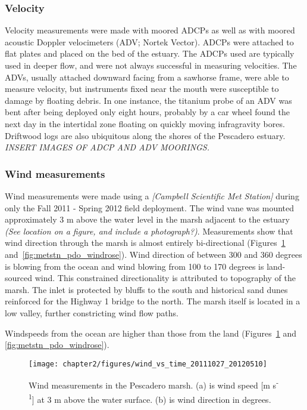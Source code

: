 \subsubsection{Velocity} \label{sssec:velmeas}
Velocity measurements were made with moored ADCPs as well as with moored acoustic Doppler velocimeters (ADV; Nortek Vector). ADCPs were attached to flat plates and placed on the bed of the estuary. The ADCPs used are typically used in deeper flow, and were not always successful in measuring velocities. The ADVs, usually attached downward facing from a sawhorse frame, were able to measure velocity, but instruments fixed near the mouth were susceptible to damage by floating debris. In one instance, the titanium probe of an ADV was bent after being deployed only eight hours, probably by a car wheel found the next day in the intertidal zone floating on quickly moving infragravity bores. Driftwood logs are also ubiquitous along the shores of the Pescadero estuary.  \emph{INSERT IMAGES OF ADCP AND ADV MOORINGS.}


\subsubsection{Wind measurements} \label{sssec:windmeas}
Wind measurements were made using a \emph{[Campbell Scientific Met Station]} during only the Fall 2011 - Spring 2012 field deployment. The wind vane was mounted approximately 3 m above the water level in the marsh adjacent to the estuary \emph{(See location on a figure, and include a photograph?)}.  Measurements show that wind direction through the marsh is almost entirely bi-directional (Figures~\ref{fig:metstn_pdo_ws_wdir} and~\ref{fig:metstn_pdo_windrose}). Wind direction of between 300 and 360 degrees is blowing from the ocean and wind blowing from 100 to 170 degrees is land-sourced wind. This constrained directionality is attributed to topography of the marsh.  The inlet is protected by bluffs to the south and historical sand dunes reinforced for the Highway 1 bridge to the north. The marsh itself is located in a low valley, further constricting wind flow paths. 

Windspeeds from the ocean are higher than those from the land (Figures~\ref{fig:metstn_pdo_ws_wdir} and~
\ref{fig:metstn_pdo_windrose}). 

\begin{figure} \centering
	\texttt{[image: chapter2/figures/wind\_vs\_time\_20111027\_20120510]} \caption{Wind measurements in the Pescadero marsh. (a) is wind speed [m s\textsuperscript{-1}] at 3 m above the water surface. (b) is wind direction in degrees.}
\label{fig:metstn_pdo_ws_wdir} 
\end{figure}

